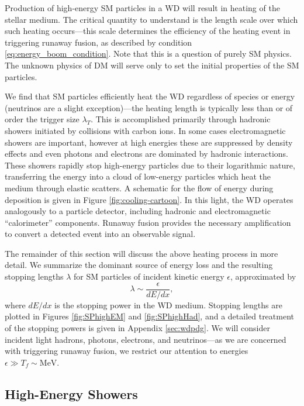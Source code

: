 Production of high-energy SM particles in a WD will result in heating of the stellar medium.
The critical quantity to understand is the length scale over which such heating occurs---this scale determines the efficiency of the heating event in triggering runaway fusion, as described by condition \eqref{eq:energy_boom_condition}.
Note that this is a question of purely SM physics.
The unknown physics of DM will serve only to set the initial properties of the SM particles.

We find that SM particles efficiently heat the WD regardless of species or energy (neutrinos are a slight exception)---the heating length is typically less than or of order the trigger size $\lambda_T$. 
This is accomplished primarily through hadronic showers initiated by collisions with carbon ions.
In some cases electromagnetic showers are important, however at high energies these are suppressed by density effects and even photons and electrons are dominated by hadronic interactions.
These showers rapidly stop high-energy particles due to their logarithmic nature, transferring the energy into a cloud of low-energy particles which heat the medium through elastic scatters.
A schematic for the flow of energy during deposition is given in Figure \ref{fig:cooling-cartoon}.
In this light, the WD operates analogously to a particle detector, including hadronic and electromagnetic ``calorimeter'' components.
Runaway fusion provides the necessary amplification to convert a detected event into an observable signal.

The remainder of this section will discuss the above heating process in more detail.
We summarize the dominant source of energy loss and the resulting stopping lengths $\lambda$ for SM particles of incident kinetic energy $\epsilon$, approximated by
\begin{equation}
\lambda \sim \frac{\epsilon}{dE/dx},
\end{equation}
where $dE/dx$ is the stopping power in the WD medium.
Stopping lengths are plotted in Figures \ref{fig:SPhighEM} and \ref{fig:SPhighHad}, and a detailed treatment of the stopping powers is given in Appendix \ref{sec:wdpdg}. 
We will consider incident light hadrons, photons, electrons, and neutrinos---as we are concerned with triggering runaway fusion, we restrict our attention to energies $\epsilon \gg T_f \sim \text{MeV}$.

\subsection{High-Energy Showers}

